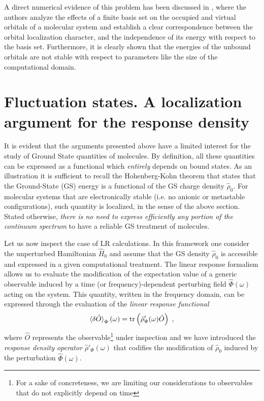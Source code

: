 \documentclass[reprint,aps,prb]{revtex4-1}
\newcommand{\be}{\begin{equation}}
\newcommand{\ee}{\end{equation}}
\newcommand{\lb}{\label}
\newcommand{\op}[1]{\hat {#1}}
\newcommand{\trace}[1]{\mathrm{tr}\left(#1\right)}
\newcommand{\dmnot}{\op{\rho}_0}
\newcommand{\dm}{\op{\rho}}
\newcommand{\hnot}{\op{H}_0}
\begin{document}
A direct numerical evidence of this problem has been discussed in \cite{boffi2016}, where the authors analyze the effects of a finite basis set on the 
occupied and virtual orbitals of a molecular system and establish a clear correspondence between the orbital localization character, 
and the independence of its energy with respect to the basis set. 
Furthermore, it is clearly shown that the energies of the unbound orbitals are not stable with respect to parameters like the size of the computational domain.  

\section{Fluctuation states. A localization argument for the response density}
\label{FluctuationState}
It is evident that the arguments presented above have a limited interest for the study
of Ground State quantities of molecules. By definition, all these quantities can be expressed as a 
functional which \emph{entirely} depends on bound states. As an illustration it is sufficient to recall
the Hohenberg-Kohn theorem that states that the Ground-State (GS) energy is a functional of the GS
charge density $\dmnot$. For molecular systems that are electronically stable (i.e. no anionic or metastable configurations),
such quantity is localized, in the sense of the above section. Stated otherwise, 
\emph{there is no need to express efficiently any portion of the continuum spectrum} to have a reliable GS treatment of molecules.

Let us now inspect the case of LR calculations.
In this framework one consider the unperturbed Hamiltonian $\hnot$ and assume that 
the GS density $\dmnot$ is accessible and expressed in a given computational treatment. 
The linear response formalism allows us to evaluate the modification of the expectation value of a generic observable induced by a 
time (or frequency)-dependent perturbing field $\op\Phi(\omega)$ acting on the system. 
This quantity, written in the frequency domain, can be expressed through the evaluation of the \emph{linear response functional}
\be\lb{LinearResponseFunctDef1}
\braket{\delta\op O}_\Phi(\omega) = \trace{\dm'_\Phi(\omega)\op O} \;,
\ee
where $\op O$ represents the observable\footnote{For a sake of concreteness, we are limiting our considerations to observables that do not explicitly depend on time} under inspection 
and we have introduced the \emph{response density operator} $\dm'_\Phi(\omega)$ that codifies the modification of $\dmnot$ induced by the perturbation $\op\Phi(\omega)$. 
\end{document}
